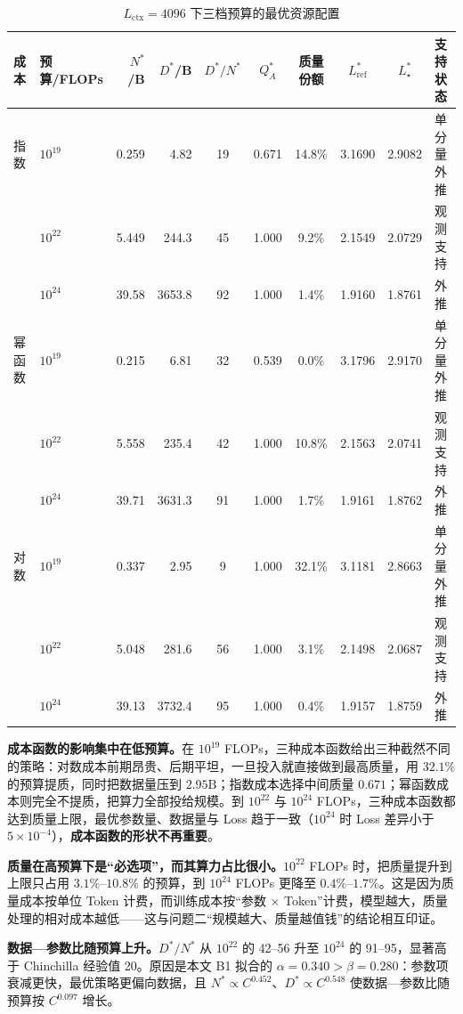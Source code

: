 \begin{table}[htbp]
\centering
\small
\caption{$L_{\mathrm{ctx}}=4096$ 下三档预算的最优资源配置}
\label{tab:p3_main}
\setlength{\tabcolsep}{4pt}
\begin{tabular}{llrrcccccl}
\toprule
成本 & 预算/FLOPs & $N^*$/B & $D^*$/B & $D^*/N^*$ & $Q_A^*$ & 质量份额 & $L^*_{\mathrm{ref}}$ & $L^*_\star$ & 支持状态 \\
\midrule
指数 & $10^{19}$ & 0.259 & 4.82 & 19 & 0.671 & 14.8\% & 3.1690 & 2.9082 & 单分量外推 \\
 & $10^{22}$ & 5.449 & 244.3 & 45 & 1.000 & 9.2\% & 2.1549 & 2.0729 & 观测支持 \\
 & $10^{24}$ & 39.58 & 3653.8 & 92 & 1.000 & 1.4\% & 1.9160 & 1.8761 & 外推 \\
\midrule
幂函数 & $10^{19}$ & 0.215 & 6.81 & 32 & 0.539 & 0.0\% & 3.1796 & 2.9170 & 单分量外推 \\
 & $10^{22}$ & 5.558 & 235.4 & 42 & 1.000 & 10.8\% & 2.1563 & 2.0741 & 观测支持 \\
 & $10^{24}$ & 39.71 & 3631.3 & 91 & 1.000 & 1.7\% & 1.9161 & 1.8762 & 外推 \\
\midrule
对数 & $10^{19}$ & 0.337 & 2.95 & 9 & 1.000 & 32.1\% & 3.1181 & 2.8663 & 单分量外推 \\
 & $10^{22}$ & 5.048 & 281.6 & 56 & 1.000 & 3.1\% & 2.1498 & 2.0687 & 观测支持 \\
 & $10^{24}$ & 39.13 & 3732.4 & 95 & 1.000 & 0.4\% & 1.9157 & 1.8759 & 外推 \\
\bottomrule
\end{tabular}
\end{table}

\textbf{成本函数的影响集中在低预算。}在 $10^{19}$ FLOPs，三种成本函数给出三种截然不同的策略：对数成本前期昂贵、后期平坦，一旦投入就直接做到最高质量，用 $32.1\%$ 的预算提质，同时把数据量压到 $2.95\mathrm{B}$；指数成本选择中间质量 $0.671$；幂函数成本则完全不提质，把算力全部投给规模。到 $10^{22}$ 与 $10^{24}$ FLOPs，三种成本函数都达到质量上限，最优参数量、数据量与 Loss 趋于一致（$10^{24}$ 时 Loss 差异小于 $5\times10^{-4}$），\textbf{成本函数的形状不再重要}。

\textbf{质量在高预算下是“必选项”，而其算力占比很小。}$10^{22}$ FLOPs 时，把质量提升到上限只占用 $3.1\%$--$10.8\%$ 的预算，到 $10^{24}$ FLOPs 更降至 $0.4\%$--$1.7\%$。这是因为质量成本按单位 Token 计费，而训练成本按“参数 × Token”计费，模型越大，质量处理的相对成本越低——这与问题二“规模越大、质量越值钱”的结论相互印证。

\textbf{数据—参数比随预算上升。}$D^*/N^*$ 从 $10^{22}$ 的 42--56 升至 $10^{24}$ 的 91--95，显著高于 Chinchilla 经验值 20\cite{hoffmann2022compute}。原因是本文 B1 拟合的 $\alpha=0.340>\beta=0.280$：参数项衰减更快，最优策略更偏向数据，且 $N^*\propto C^{0.452}$、$D^*\propto C^{0.548}$ 使数据—参数比随预算按 $C^{0.097}$ 增长。


